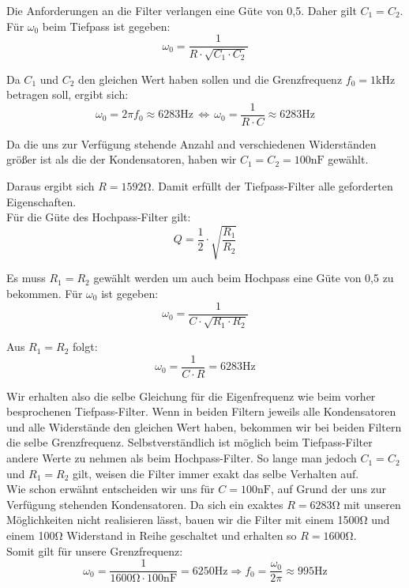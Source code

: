 Die Anforderungen an die Filter verlangen eine Güte von 0,5. Daher gilt $C_{1}=C_{2}$.\\
Für $\omega_{0}$ beim Tiefpass ist gegeben:
$$\omega_{0}=\frac{1}{R\cdot\sqrt{C_{1} \cdot C_{2}}}$$

Da $C_{1}$ und $C_{2}$ den gleichen Wert haben sollen und die Grenzfrequenz $f_{0}=1\si{\kilo\hertz}$ betragen soll, ergibt sich:
$$\omega_{0}=2\pi f_{0} \approx 6283\si{\hertz} \, \Leftrightarrow \,\omega_{0}=\frac{1}{R\cdot C}\approx 6283\si{\hertz} $$

Da die uns zur Verfügung stehende Anzahl and verschiedenen Widerständen größer ist als die der Kondensatoren, haben wir $C_{1}=C_{2}=100\si{\nano\farad}$ gewählt.

Daraus ergibt sich $R=1592\si{\ohm}$. Damit erfüllt der Tiefpass-Filter alle geforderten Eigenschaften. \\
Für die Güte des Hochpass-Filter gilt:
$$Q=\frac{1}{2}\cdot\sqrt{\frac{R_{1}}{R_{2}}}$$

Es muss $R_{1}=R_{2}$ gewählt werden um auch beim Hochpass eine Güte von 0,5 zu bekommen.
Für $\omega_{0}$ ist gegeben:
$$\omega_{0} = \frac{1}{C\cdot\sqrt{R_{1}\cdot R_{2}}}$$

Aus $R_{1}=R_{2}$ folgt:
$$\omega_{0} = \frac{1}{C\cdot R}=6283\si{\hertz}$$

Wir erhalten also die selbe Gleichung für die Eigenfrequenz wie beim vorher besprochenen Tiefpass-Filter. Wenn in beiden Filtern jeweils alle Kondensatoren und alle Widerstände den gleichen Wert haben, bekommen wir bei beiden Filtern die selbe Grenzfrequenz. Selbstverständlich ist möglich beim Tiefpass-Filter andere Werte zu nehmen als beim Hochpass-Filter. So lange man jedoch $C_{1}=C_{2}$ und $R_{1}=R_{2}$ gilt, weisen die Filter immer exakt das selbe Verhalten auf.\\
Wie schon erwähnt entscheiden wir uns für $C=100\si{\nano\farad}$, auf Grund der uns zur Verfügung stehenden Kondensatoren. Da sich ein exaktes $R=6283\si{\ohm}$ mit unseren Möglichkeiten nicht realisieren lässt, bauen wir die Filter mit einem 1500\si{\ohm} und einem 100\si{\ohm} Widerstand in Reihe geschaltet und erhalten so $R=1600\si{\ohm}$.\\
Somit gilt für unsere Grenzfrequenz:
$$\omega_{0}=\frac{1}{1600\si{\ohm}\cdot 100\si{\nano\farad}}=6250\si{\hertz}\Rightarrow f_{0}=\frac{\omega_{0}}{2\pi}\approx 995\si{\hertz}$$

